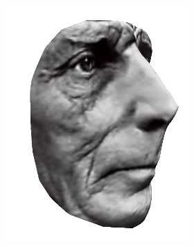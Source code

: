 \begin{figure}
\begin{subfigure}{0.23\textwidth}
        \includegraphics[width=\textwidth]{statistical_normals/images/gsfs_results/celebrities/samuel_beckett_spherical_texture.png}
    \end{subfigure}
    \begin{subfigure}{0.23\textwidth}
        \centering

\end{subfigure}
\end{figure}

